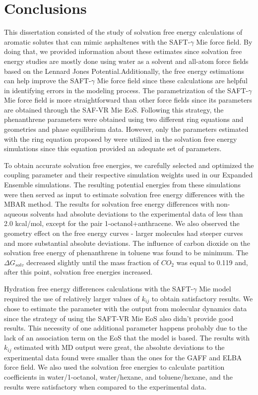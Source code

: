 \chapter{Conclusions} %

\label{Chapter6} %

This dissertation consisted of the study of solvation free
energy calculations of aromatic solutes that can mimic asphaltenes with the SAFT-$\gamma$ 
Mie force field. By doing that, we provided information about these estimates since solvation free energy studies are mostly done using water as a solvent and all-atom force fields based on the Lennard Jones Potential.Additionally, the free energy estimations can help improve the SAFT-$\gamma$  Mie force field since these calculations are helpful in identifying errors in the modeling process. The parametrization of the SAFT-$\gamma$  Mie force field is more straightforward
than other force fields since its parameters are obtained through the SAF-VR
Mie EoS. Following this strategy, the phenanthrene parameters were obtained using two
different ring equations and geometries and phase equilibrium data. However, only the parameters estimated with the ring equation proposed by  were utilized in the solvation free energy simulations since this equation provided an adequate set of parameters.


To obtain accurate solvation free energies, we carefully selected and optimized the coupling parameter and their respective simulation weights used in our Expanded Ensemble simulations. The resulting potential energies from these simulations were then served as input to estimate solvation free energy differences with the MBAR method. The results for solvation free energy differences with non-aqueous solvents had absolute deviations to the experimental
data of less than 2.0 kcal/mol, except for the pair 1-octanol+anthracene. We also observed the geometry
effect on the free energy curves - larger molecules had steeper curves
and more substantial absolute deviations. The influence of carbon dioxide on the solvation free
energy of phenanthrene in toluene was found to be minimum. The $\Delta G_{solv}$ decreased slightly until the mass fraction of $CO_{2}$ was equal to 0.119 and, after this point, solvation free
energies increased. 

Hydration free energy differences calculations with the SAFT-$\gamma$ Mie model
required the use of relatively larger values of $k_{ij}$ to obtain satisfactory results.
We chose to estimate the parameter with the output from molecular dynamics data since
the strategy of using the SAFT-VR Mie EoS also didn’t provide good results. This
necessity of one additional parameter happens probably due to the lack of an association term
on the EoS that the model is based. The results with $k_{ij}$ estimated with MD output
were great, the absolute deviations to the experimental data found were smaller than
the ones for the GAFF and ELBA force field. We also used the solvation free energies to calculate partition coefficients in water/1-octanol, water/hexane, and toluene/hexane, and the results were satisfactory when compared to the experimental data.

